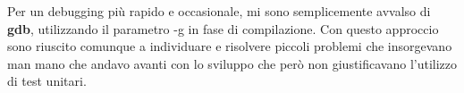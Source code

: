 \documentclass[a4paper]{article}
\begin{document}
    Per un debugging più rapido e occasionale, mi sono semplicemente avvalso di \textbf{gdb}, utilizzando il parametro -g in fase di compilazione. Con questo approccio sono riuscito comunque a individuare e risolvere piccoli problemi che insorgevano man mano che andavo avanti con lo sviluppo che però non giustificavano l'utilizzo di test unitari.
    
\end{document}
